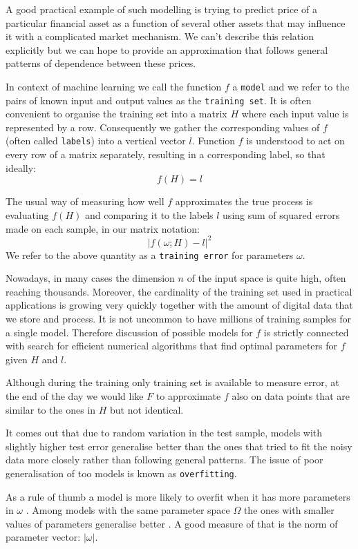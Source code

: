 \documentclass[a4paper]{article}
\theoremstyle{break}
\begin{document}
A good practical example of such modelling is trying to predict price of a particular financial asset as a function of several other assets that may influence it with a complicated market mechanism. We can't describe this relation explicitly but we can hope to provide an approximation that follows general patterns of dependence between these prices.

In context of machine learning we call the function $f$ a {\tt model} and we refer to the pairs of known input and output values as the {\tt training set}. It is often convenient to organise the training set into a matrix $H$ where each input value is represented by a row. Consequently we gather the corresponding values of $f$ (often called {\tt labels}) into a vertical vector $l$. Function $f$ is understood to act on every row of a matrix separately, resulting in a corresponding label, so that ideally:
    $$ f(H) = l $$

The usual way of measuring how well $f$ approximates the true process is evaluating $f(H)$ and comparing it to the labels $l$ using sum of squared errors made on each sample, in our matrix notation:
$$ | f(\omega; H) - l |^2 $$
We refer to the above quantity as a {\tt training error} for parameters $\omega$.

Nowadays, in many cases the dimension $n$ of the input space is quite high, often reaching thousands. Moreover, the cardinality of the training set used in practical applications is growing very quickly together with the amount of digital data that we store and process. It is not uncommon to have millions of training samples for a single model. Therefore discussion of possible models for $f$ is strictly connected with search for efficient numerical algorithms that find optimal parameters for $f$ given $H$ and $l$.

Although during the training only training set is available to measure error, at the end of the day we would like $F$ to approximate $f$ also on data points that are similar to the ones in $H$ but not identical.

It comes out that due to random variation in the test sample,  models with slightly higher test error generalise better than the ones that tried to fit the noisy data more closely rather than following general patterns.
The issue of poor generalisation of too  models is known as {\tt overfitting}.

As a rule of thumb a model is more likely to overfit when it has more parameters in $ \omega $ \cite[pp112-113]{goodfellow}. Among models with the same parameter space $ \Omega $ the ones with smaller values of parameters generalise better \cite[p119]{goodfellow}. A good measure of that is the norm of parameter vector: $ | \omega | $.
\end{document}
